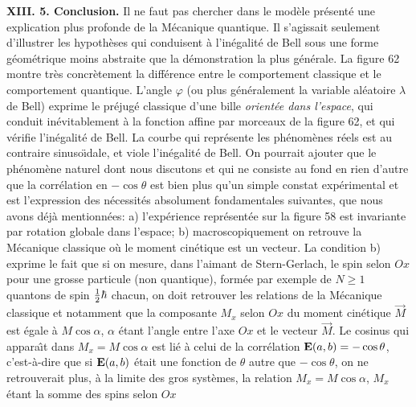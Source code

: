 {\bf XIII. 5. Conclusion.}
\medskip
Il ne faut pas chercher dans le mod\`ele pr\'esent\'e une explication plus 
profonde de la M\'ecanique quantique. Il s'agissait seulement d'illustrer 
les hypoth\`eses qui conduisent \`a l'in\'egalit\'e de Bell sous une forme 
g\'eom\'etrique moins abstraite que la d\'emonstration la plus  
g\'en\'erale. La figure 62 montre tr\`es concr\`etement la diff\'erence   
entre le comportement classique et le comportement quantique. L'angle 
$\varphi$ (ou plus g\'en\'eralement la variable al\'eatoire $\lambda$ de  
Bell) exprime le pr\'ejug\'e classique d'une bille {\it orient\'ee dans 
l'espace}, qui conduit in\'evitablement \`a la fonction affine par 
morceaux de la figure 62, et qui v\'erifie l'in\'egalit\'e de Bell. La  
courbe qui repr\'esente  les ph\'enom\`enes r\'eels est au contraire 
sinuso\"\i dale, et viole l'in\'egalit\'e de Bell. 
\medskip 
On pourrait ajouter que le ph\'enom\`ene naturel dont nous discutons  
et qui ne consiste au fond en rien d'autre que la corr\'elation en 
$-\cos\theta$ est bien plus qu'un simple constat exp\'erimental 
et est l'expression des n\'ecessit\'es absolument fondamentales  
suivantes, que nous avons d\'ej\`a mentionn\'ees:     
\smallskip  
a) l'exp\'erience repr\'esent\'ee sur la figure 58 est invariante 
par  rotation globale dans l'espace;   
\smallskip 
b) macroscopiquement on retrouve la M\'ecanique classique  
o\`u le moment cin\'etique est un vecteur.  
\medskip 
La condition b) exprime le fait que si on mesure,  dans l'aimant de
Stern-Gerlach,  le {\og spin selon $Ox$\fg} pour une grosse particule
(non quantique),  form\'ee par exemple de $N \geq 1$ quantons de spin
${1\over 2}\hbar$ chacun,  on doit retrouver les relations de la
M\'ecanique classique et notamment que la composante $M_x$ selon
$Ox$ du moment cin\'etique ${\vec M}$ est \'egale \`a $M \cos\alpha$, 
$\alpha$ \'etant l'angle entre l'axe $Ox$ et le vecteur ${\vec M}$. 
Le cosinus qui appara{\^\i}t dans $M_x = M\cos\alpha$ est li\'e \`a
celui de la corr\'elation ${\bf E}(a,b) = -\cos\theta$,  c'est-\`a-dire
que si ${\bf E}(a,b)$ \'etait une fonction de $\theta$ autre que $-\cos\theta$, 
on ne retrouverait plus,  \`a la limite des gros syst\`emes,  la relation
$M_x = M \cos\alpha$,  $M_x$ \'etant la somme des {\og spins selon $Ox$\fg}

